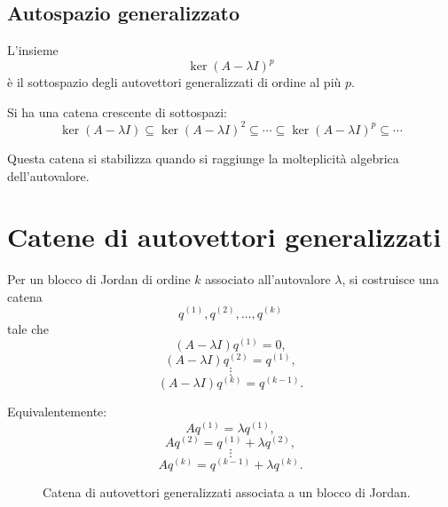 \subsection{Autospazio generalizzato}

L'insieme
\[
\ker(A-\lambda I)^p
\]
è il sottospazio degli autovettori generalizzati di ordine al più $p$.

Si ha una catena crescente di sottospazi:
\begin{equation}
\ker(A-\lambda I)\subseteq \ker(A-\lambda I)^2 \subseteq \cdots \subseteq \ker(A-\lambda I)^p \subseteq \cdots
\label{eq:L6_chain_kernels}
\end{equation}

Questa catena si stabilizza quando si raggiunge la molteplicità algebrica dell'autovalore.

\section{Catene di autovettori generalizzati}

Per un blocco di Jordan di ordine $k$ associato all'autovalore $\lambda$, si costruisce una catena
\[
q^{(1)},q^{(2)},\dots,q^{(k)}
\]
tale che
\begin{equation}
(A-\lambda I)q^{(1)}=0,
\label{eq:L6_chain_1}
\end{equation}
\begin{equation}
(A-\lambda I)q^{(2)}=q^{(1)},
\label{eq:L6_chain_2}
\end{equation}
\[
\vdots
\]
\begin{equation}
(A-\lambda I)q^{(k)}=q^{(k-1)}.
\label{eq:L6_chain_k}
\end{equation}

Equivalentemente:
\[
Aq^{(1)}=\lambda q^{(1)},
\]
\[
Aq^{(2)}=q^{(1)}+\lambda q^{(2)},
\]
\[
\vdots
\]
\[
Aq^{(k)}=q^{(k-1)}+\lambda q^{(k)}.
\]

\begin{figure}[H]
\centering
{}
\caption{Catena di autovettori generalizzati associata a un blocco di Jordan.}
\end{figure}

